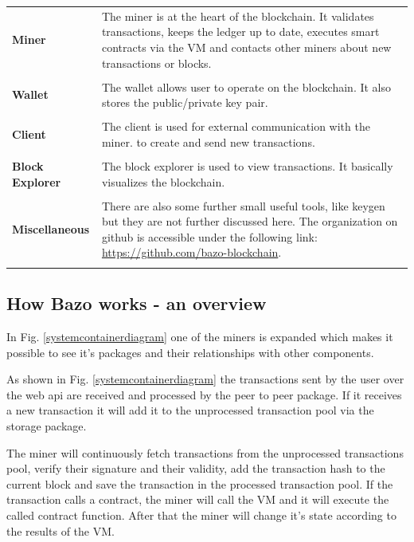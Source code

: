 \begin{tabular}[t]{ p{3cm} p{12.5cm}}
\textbf{Miner} &
The miner is at the heart of the blockchain. It validates transactions, keeps the ledger up to date, executes smart contracts via the VM and contacts other miners about new transactions or blocks. \\ \\
 
\raggedright
\textbf{Wallet} &
The wallet allows user to operate on the blockchain. It also stores the public/private key pair. \cite{ba_wallet} \\ \\
 
\textbf{Client} &
The client is used for external communication with the miner. to create and send new transactions. \\ \\

\raggedright
\textbf{Block Explorer} & 
The block explorer is used to view transactions. It basically visualizes the blockchain. \\ \\

\raggedright
\textbf{Miscellaneous} & 
There are also some further small useful tools, like keygen but they are not further discussed here. The organization on github is accessible under the following link: \href{https://github.com/bazo-blockchain}{https://github.com/bazo-blockchain}. \\ \\
\end{tabular}

\subsection{How Bazo works - an overview}
In Fig. \ref{systemcontainerdiagram} one of the miners is expanded which makes it possible to see it's packages and their relationships with other components. 

As shown in Fig. \ref{systemcontainerdiagram} the transactions sent by the user over the web api are received and processed by the peer to peer package. If it receives a new transaction it will add it to the unprocessed transaction pool via the storage package. 

The miner will continuously fetch transactions from the unprocessed transactions pool, verify their signature and their validity, add the transaction hash to the current block and save the transaction in the processed transaction pool. If the transaction calls a contract, the miner will call the VM and it will execute the called contract function. After that the miner will change it's state according to the results of the VM.


